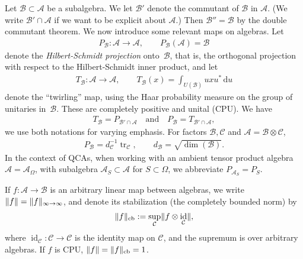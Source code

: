 \documentclass[11pt,reqno]{amsart}
\theoremstyle{definition}
\theoremstyle{remark}
\numberwithin{equation}{section}
\DeclareMathOperator{\tr}{tr}
\DeclareMathOperator{\id}{id}
\DeclareMathOperator{\cb}{cb}
\newcommand{\ot}{\otimes}
\newcommand{\eps}{\varepsilon}
\newcommand{\cA}{\mathcal A}
\newcommand{\cB}{\mathcal B}
\newcommand{\cC}{\mathcal C}
\DeclarePairedDelimiter\norm{\lVert}{\rVert}
\newcommand{\approxEq}[1]{=_{#1}}
\begin{document}
Let $\cB \subset \cA$ be a subalgebra.
We let $\cB'$ denote the commutant of $\cB$ in $\cA$.
(We write $\cB' \cap \cA$ if we want to be explicit about $\cA$.)
Then $\cB'' = \cB$ by the double commutant theorem.
We now introduce some relevant maps on algebras.
Let
\begin{align}\label{eq:P-notation}
    P_\cB : \cA \to \cA, \qquad P_\cB(\cA) = \cB
\end{align}
denote the \emph{Hilbert-Schmidt projection} onto~$\cB$, that is, the orthogonal projection with respect to the Hilbert-Schmidt inner product, and let
\begin{align} \label{eq:T-notation}
 T_{\cB} : \cA \to \cA, \qquad T_{\cB}(x) = \int_{U(\cB)} u x u^* \, \mathrm{d}u
\end{align}
denote the ``twirling'' map, using the Haar probability measure on the group of unitaries in~$\cB$.
These are completely positive and unital (CPU).
We have
\begin{align}
     T_{\cB} = P_{\cB' \cap \cA}
\quad\text{and}\quad
     P_{\cB} = T_{\cB' \cap \cA},
 \end{align}
we use both notations for varying emphasis.
For factors $\cB, \cC$ and $\cA = \cB \ot \cC$,
 \begin{align*}
     P_\cB = d_\cC^{-1} \tr_\cC, \qquad  d_\cB=\sqrt{\dim(\cB)}.
 \end{align*}
In the context of QCAs, when working with an ambient tensor product algebra $\cA = \cA_{\Omega}$, with subalgebra $\cA_S \subset \cA$ for $S \subset \Omega$, we abbreviate $P_{\cA_S} = P_S$.

If $f : \cA \to \cB$ is an arbitrary linear map between algebras, we write $\norm f = \norm f_{\infty\to\infty}$, and denote its stabilization (the completely bounded norm) by
\begin{align*}
    \norm f_{\cb} := \sup_{\cC} \norm{f \ot \id_{\cC}},
\end{align*}
where $\id_{\cC}: \cC \to \cC$ is the identity map on $\cC$, and the supremum is over arbitrary algebras.
If $f$ is CPU, $\norm{f} = \norm{f}_{\cb} = 1$.


\end{document}

